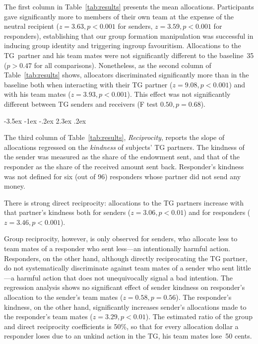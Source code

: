 \documentclass[12pt,a4paper]{article}
\makeatletter
\renewcommand\subsection{\@startsection {subsection}{1}{\z@}%
{-3.5ex \@plus -1ex \@minus -.2ex}%
{2.3ex \@plus.2ex}%
{\it\large}}
\providecommand{\DIFaddtex}[1]{{\protect\color{blue}\uwave{#1}}} %
\providecommand{\DIFaddbegin}{} %
\providecommand{\DIFaddend}{} %
\providecommand{\DIFadd}[1]{\texorpdfstring{\DIFaddtex{#1}}{#1}} %
\makeatother
\begin{document}
The first column in Table~\ref{tab:results} presents the mean allocations.
Participants gave significantly more to members of their own team at the expense
of the neutral recipient ($z=3.63,p< 0.001$ for senders, 
$z=3.59,p< 0.001$ for
responders), establishing that our group formation manipulation was successful
in inducing group identity and triggering ingroup favouritism. Allocations to
the TG~partner and his team mates were not significantly different to the
baseline~35 ($p>0.47$ for all comparisons). Nonetheless, as the second 
column of Table~\ref{tab:results} shows, allocators discriminated significantly more
than in the baseline both when interacting with their TG partner
($z=9.08,p< 0.001$) and with his team mates 
($z=3.93,p< 0.001$). This effect was not
significantly different between TG senders and receivers (F test $0.50,
p= 0.68$).

\DIFaddbegin \subsection{\DIFadd{Direct and group reciprocity}}
\label{sec:reciprocity}
\DIFaddend 

The third column of Table~\ref{tab:results}, \emph{Reciprocity}, reports the slope of
allocations regressed on the \emph{kindness} of subjects' TG partners. 
The kindness of the sender was measured
as the share of the endowment sent, and that of the responder as the share
of the received amount sent back. Responder's kindness was not defined
for six (out of 96) responders whose partner did not send any money.

There is strong direct reciprocity: allocations
to the TG partners increase with that partner's kindness both for
senders ($z=3.06,p< 0.01$) and for responders 
($z=3.46,p< 0.001$).

Group reciprocity, however, is only observed for senders, who allocate
less to team mates of a responder who sent less---an intentionally harmful action.
Responders, on the other hand, although directly reciprocating the
TG partner, do not systematically discriminate against team mates
of a sender who sent little---a harmful action that does not unequivocally
signal a bad intention. The regression analysis shows no significant
effect of sender kindness on responder's allocation to the sender's
team mates ($z=0.58,p= 0.56$). 
The responder's kindness, on the other
hand, significantly increases sender's allocations made to the responder's team mates 
($z=3.29,p< 0.01$).
The estimated ratio of the group and direct reciprocity coefficients
is 50\%, so that for every allocation dollar a responder
loses due to an unkind action in the TG, his team mates lose~50 cents.
\end{document}
